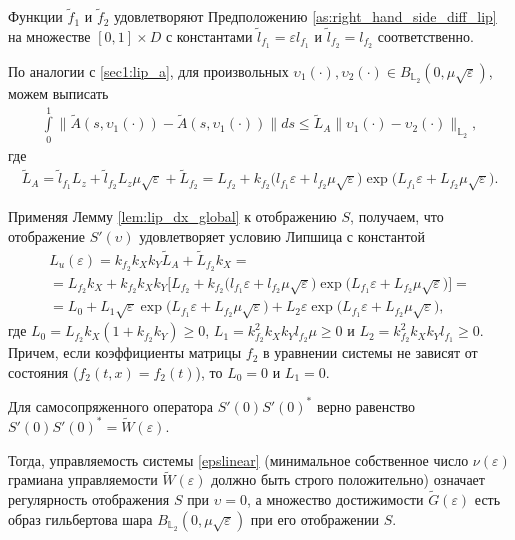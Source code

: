 \documentclass[../main.tex]{subfiles}
\begin{document}
  Функции  $\widetilde{f}_1$ и $\widetilde{f}_2$ удовлетворяют Предположению \ref{as:right_hand_side_diff_lip} на множестве $[0, 1]\times D$ с константами $\widetilde{l}_{f_1} = \varepsilon l_{f_1} $ и  $\widetilde{l}_{f_2} = l_{f_2} $ соответственно. 
  
  По аналогии с \eqref{sec1:lip_a}, для произвольных $ \upsilon_1(\cdot), \upsilon_2(\cdot) \in B_{\mathbb{L}_2}(0,\mu\sqrt{\varepsilon})$, можем выписать
  \begin{gather*}
  				\int\limits_{0}^{1} \|\widetilde{A}(s, \upsilon_1(\cdot)) - \widetilde{A}(s, \upsilon_1(\cdot)) \| ds \leqslant \widetilde{L}_A \| \upsilon_1(\cdot) - \upsilon_2(\cdot) \|_{\mathbb{L}_2},
  \end{gather*}
 где 
 \begin{gather}\label{sec1: eps_L_A}
 		\widetilde{L}_A = \widetilde{l}_{f_1} L_z  + \widetilde{l}_{f_2} L_z \mu \sqrt{\varepsilon} + \widetilde{L}_{f_2} = 
 		L_{f_2} + k_{f_2} \Big( l_{f_1}  \varepsilon  + l_{f_2}  \mu \sqrt{\varepsilon} \Big) \exp\big( L_{f_1} \varepsilon + L_{f_2} \mu \sqrt{\varepsilon} \big).
 \end{gather}
 
 Применяя Лемму \eqref{lem:lip_dx_global} к отображению $S$, получаем, что отображение $S'(\upsilon)$ удовлетворяет условию Липшица с константой 
 \begin{gather*}
 	L_u(\varepsilon) = k_{f_2} k_X k_Y 	\widetilde{L}_A + \widetilde{L}_{f_2} k_X  = \\ = 
 	 L_{f_2} k_X + 
 	 k_{f_2} k_X k_Y \Big[ L_{f_2} + k_{f_2} \Big( l_{f_1}  \varepsilon  + l_{f_2}  \mu \sqrt{\varepsilon} \Big) \exp\big( L_{f_1} \varepsilon + L_{f_2} \mu \sqrt{\varepsilon} \big) \Big] = \\ =
 	L_0 + L_1 \sqrt{\varepsilon} \exp\big( L_{f_1} \varepsilon + L_{f_2} \mu \sqrt{\varepsilon} \big) + L_2 \varepsilon \exp\big( L_{f_1} \varepsilon + L_{f_2} \mu \sqrt{\varepsilon} \big),
 \end{gather*} 
 где $ L_0 = L_{f_2} k_X (1 + k_{f_2}  k_Y) \geqslant 0$, $L_1 = k_{f_2}^2 k_X k_Y l_{f_2}  \mu \geqslant 0 $ и $L_2 = k_{f_2}^2 k_X k_Y l_{f_1} \geqslant 0 $. 
 Причем, если коэффициенты матрицы $f_2$ в уравнении системы не зависят от состояния ($f_2(t,x) = f_2(t)$), то $L_0 = 0$ и $L_1 = 0$. 
  
  Для самосопряженного оператора $S'(0)S'(0)^*$ верно равенство $S'(0)S'(0)^* = \widetilde{W}(\varepsilon)$.
  
   Тогда, управляемость системы \eqref{epslinear} (минимальное собственное число $ \nu(\varepsilon) $ грамиана управляемости $\widetilde{W}(\varepsilon)$ должно быть строго положительно) означает регулярность отображения $S$ при $\upsilon = 0$, а множество достижимости $\widetilde{G}(\varepsilon)$ есть образ гильбертова шара $B_{\mathbb{L}_2}(0,\mu\sqrt{\varepsilon})$ при его отображении $S$.
   
\end{document}
